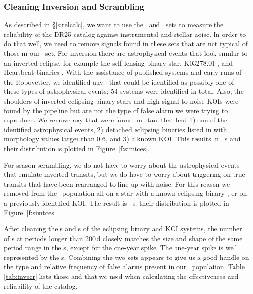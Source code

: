 
\subsubsection{Cleaning Inversion and Scrambling}
\label{s:clean}
As described in \S\ref{s:relcalc}, we want to use the \invtce\ and \scrtce\ sets to measure the reliability of the DR25 catalog against instrumental and stellar noise.  In order to do that well, we need to remove signals found in these sets that are not typical of those in our \opstce\ set.  For inversion there are astrophysical events that look similar to an inverted eclipse, for example the self-lensing binary star, K03278.01 \citep{Kruse2014}, and Heartbeat binaries \citep{Thompson2012}.  With the assistance of published systems and early runs of the Robovetter, we identified any \invtce\ that could be identified as possibly one of these types of astrophysical events; 54 systems were identified in total.  Also, the shoulders of inverted eclipsing binary stars and high signal-to-noise KOIs were found by the pipeline but are not the type of false alarm we were trying to reproduce.  We remove any  that were found on stars that had 1) one of the identified astrophysical events, 2) detached eclipsing binaries listed in \citet{Kirk2016} with morphology values larger than 0.6, and 3) a known KOI.  This results in \ninvtces\ \invtce s and their distribution is plotted in Figure~\ref{f:simtces}.

For season scrambling, we do not have to worry about the astrophysical events that emulate inverted transits, but we do have to worry about triggering on true transits that have been rearranged to line up with noise. For this reason we removed from the \scrtce\ population all on a star with a known eclipsing binary \citep{Kirk2016}, or on a previously identified KOI.  The result is \nscrtces\ \scrtce s; their distribution is plotted in Figure~\ref{f:simtces}. 

After cleaning the \invtce s and \scrtce s of the eclipsing binary and KOI systems, the number of \scrtce s at periods longer than 200\,d closely matches the size and shape of the same period range in the \opstce s, except for the one-year spike.  The one-year spike is well represented by the \invtce s.  Combining the two sets appears to give us a good handle on the type and relative frequency of false alarms present in our \opstce\ population. Table\,\ref{tab:invscr} lists those  and  that we used when calculating the effectiveness and reliability of the catalog.

